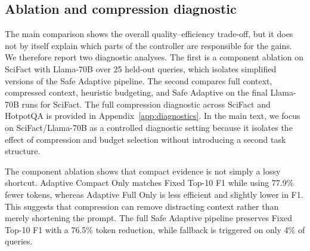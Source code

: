 \documentclass[11pt]{article}
\begin{document}
\subsection{Ablation and compression diagnostic}

The main comparison shows the overall quality--efficiency trade-off, but it does not by itself explain which parts of the controller are responsible for the gains. We therefore report two diagnostic analyses. The first is a component ablation on SciFact with Llama-70B over 25 held-out queries, which isolates simplified versions of the Safe Adaptive pipeline. The second compares full context, compressed context, heuristic budgeting, and Safe Adaptive on the final Llama-70B runs for SciFact. The full compression diagnostic across SciFact and HotpotQA is provided in Appendix~\ref{app:diagnostics}. In the main text, we focus on SciFact/Llama-70B as a controlled diagnostic setting because it isolates the effect of compression and budget selection without introducing a second task structure.


\begin{table}[t]
\centering
\small
\caption{Component ablation on SciFact with Llama-70B over 25 held-out queries.}
\label{tab:table_3_component_ablation_on_scifact_wi}
\end{table}

The component ablation shows that compact evidence is not simply a lossy shortcut. Adaptive Compact Only matches Fixed Top-10 F1 while using 77.9\% fewer tokens, whereas Adaptive Full Only is less efficient and slightly lower in F1. This suggests that compression can remove distracting context rather than merely shortening the prompt. The full Safe Adaptive pipeline preserves Fixed Top-10 F1 with a 76.5\% token reduction, while fallback is triggered on only 4\% of queries.
\end{document}
